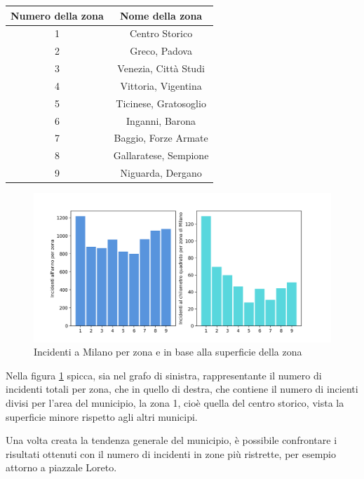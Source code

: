 \documentclass[a4paper,12pt]{report}
\begin{document}
\begin{center}
    \def\arraystretch{1.5}%
    \begin{tabular}{ |c|c| } 
    \hline
    Numero della zona & Nome della zona \\ 
    \hline
    \rowcolor{TableGray}
    1   &   Centro Storico\\
    2   &   Greco, Padova\\
    \rowcolor{TableGray}
    3   &   Venezia, Città Studi\\
    4   &   Vittoria, Vigentina \\
    \rowcolor{TableGray}
    5   &   Ticinese, Gratosoglio\\
    6   &   Inganni, Barona\\
    \rowcolor{TableGray}
    7   &   Baggio, Forze Armate\\
    8   &   Gallaratese, Sempione\\
    \rowcolor{TableGray}
    9   &   Niguarda, Dergano\\
    \hline
    \end{tabular}
\end{center}

\begin{figure}
    \includegraphics[width=\linewidth]{../src/municipi_milano/incidenti_superf.png}
    \caption{Incidenti a Milano per zona e in base alla superficie della zona}
    \label{fig:incidenti-chilometro}
\end{figure}

Nella figura \ref{fig:incidenti-chilometro} spicca, sia nel grafo di sinistra, rappresentante 
il numero di incidenti totali per zona, che in 
quello di destra, che contiene il numero di incienti divisi per l'area del municipio, 
la zona 1, cioè quella del centro storico, vista la superficie minore 
rispetto agli altri municipi.

Una volta creata la tendenza generale del municipio, è possibile confrontare i risultati 
ottenuti con il numero di incidenti in zone più ristrette, per esempio attorno a piazzale Loreto.
\end{document}
